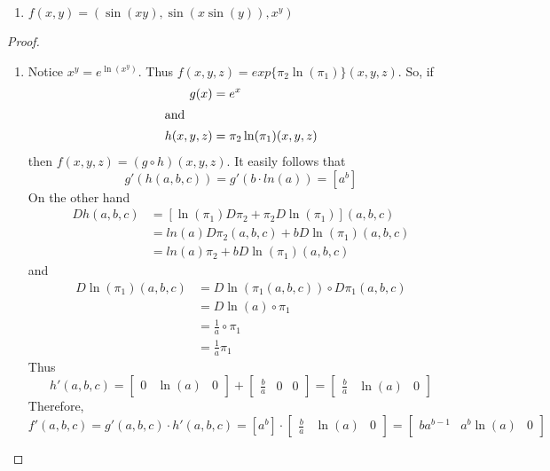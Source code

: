 \begin{enumerate}
\begin{enumerate}
        \item \( f(x,y) = \left( \sin(xy), \sin(x \sin(y)), x^y \right) \)
    \end{enumerate}
    
    \begin{proof}
    \begin{enumerate}
        \item Notice \( x^y = e^{\ln(x^y)} \). Thus \( f(x,y,z) = exp\{\pi_2\ln(\pi_1)\}(x,y,z) \). So, if
        \begin{align*}
            g(x) &= e^x \\
            \intertext{and}
            h(x,y,z) &= \pi_2\ln(\pi_1) (x,y,z)
        \end{align*}
        then \( f(x,y,z) = (g \circ h) (x,y,z) \). It easily follows that
        \[
        g'(h(a,b,c)) = g'(b\cdot ln(a)) = \left[ a^b \right]
        \]
        On the other hand
        \begin{align*}
            Dh(a,b,c) &= \left[\ln(\pi_1) D\pi_2 + \pi_2 D\ln(\pi_1)   \right] (a,b,c) \\
            &= ln(a) D\pi_2(a,b,c) + b D \ln(\pi_1)(a,b,c) \\
            &= ln(a) \pi_2 + b D \ln(\pi_1)(a,b,c)
        \end{align*}
        and
        \begin{align*}
            D\ln(\pi_1)(a,b,c) &= D\ln(\pi_1(a,b,c)) \circ D\pi_1(a,b,c) \\
            &= D\ln(a) \circ \pi_1 \\
            &= \frac{1}{a} \circ \pi_1 \\
            &= \frac{1}{a}\pi_1
        \end{align*}
        Thus
        \[
        h'(a,b,c) = \left[ \begin{array}{ccc} 0 & \ln(a) & 0 \end{array} \right] + \left[ \begin{array}{ccc} \frac{b}{a} & 0 & 0 \end{array} \right] = \left[ \begin{array}{ccc} \frac{b}{a} & \ln(a) & 0 \end{array} \right]
        \]
        Therefore,
        \[
        f'(a,b,c) = g'(a,b,c) \cdot h'(a,b,c) = \left[ a^b \right] \cdot \left[ \begin{array}{ccc} \frac{b}{a} & \ln(a) & 0 \end{array}\right] = \left[ \begin{array}{ccc} ba^{b-1} & a^{b}\ln(a) & 0 \end{array} \right]
        \]
        

\end{enumerate}
\end{proof}
\end{enumerate}
